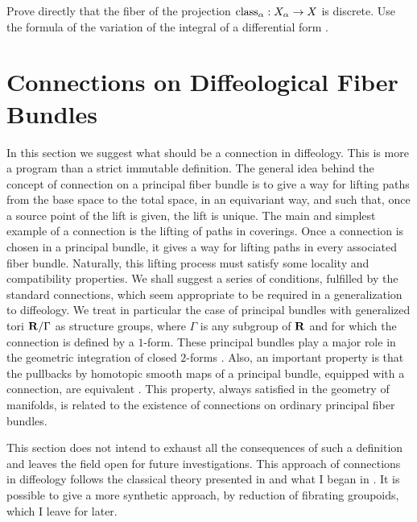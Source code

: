 \begin{exercise}
  \label{The-fiber-of-the-integration bundle}
  Prove directly that the fiber of the projection $\operatorname{class}_\alpha : X_\alpha \to X$  is discrete.
  Use the formula of the variation of the integral of a differential form .
\end{exercise} %


\section*{Connections on Diffeological Fiber Bundles}
\label{Connections-on-diffeological-fiber-bundles}

\begin{sechead}
  In this section we suggest what should be a connection in diffeology.
  This is more a program than a strict immutable definition.
  The general idea behind the concept of connection on a principal fiber bundle is to give a way for lifting paths from the base space to the total space,
  in an equivariant way, and such that,
  once a source point of the lift is given,
  the lift is unique.
  The main and simplest example of a connection is the lifting of paths in coverings.
  Once a connection is chosen in a principal bundle,
  it gives a way for lifting paths in every associated fiber bundle.
  Naturally,
  this lifting process must satisfy some locality and compatibility properties.
  We shall suggest a series of conditions,
  fulfilled by the standard connections,
  which seem appropriate to be required in a generalization to diffeology.
  We treat in particular the case of principal bundles with generalized tori ${\mathbf R}/\Gamma$ as structure groups,
  where $\Gamma$ is any subgroup of ${\mathbf R}$ and for which the connection is defined by a $1$-form.
  These principal bundles play a major role in the geometric integration of closed $2$-forms .
  Also,
  an important property is that the pullbacks by homotopic smooth maps of a principal bundle,
  equipped with a connection, are equivalent .
  This property,
  always satisfied in the geometry of manifolds,
  is related to the existence of connections on ordinary principal fiber bundles.
  
  This section does not intend to exhaust all the consequences of such a definition and leaves the field open for future  investigations.
  This approach of connections in diffeology follows the classical theory presented in \cite{KoNo63} and what I began in \cite{Igl87}.
  It is possible to give a more synthetic approach,
  by reduction of fibrating groupoids, which I leave for later.
\end{sechead}

